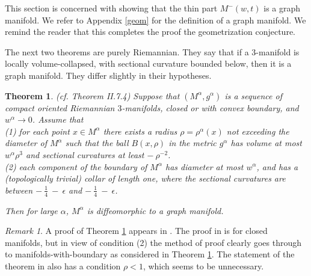 \documentclass[12pt]{amsart}
\newcommand{\al}{\alpha}
\numberwithin{equation}{section}
\theoremstyle{plain}
\newtheorem{theorem}[equation]{Theorem}
\theoremstyle{definition}
\theoremstyle{remark}
\newtheorem{remark}[equation]{Remark}
\begin{document}
This section is concerned with showing that the thin part
$M^-(w,t)$ is a graph manifold.  We refer to Appendix \ref{geom}
for the definition of a graph manifold.
We remind the reader that this completes the proof the geometrization 
conjecture.

The next two theorems are purely Riemannian. They say that if a $3$-manifold
is locally volume-collapsed, with sectional curvature bounded below, then it
is a graph manifold. They differ slightly in their hypotheses.

\begin{theorem} (cf. Theorem II.7.4) \label{thmII.7.4}
Suppose that $(M^\al, g^\al)$ is a sequence of compact oriented Riemannian
$3$-manifolds, closed or with convex boundary, and $w^\al \rightarrow 0$.
Assume that \\
(1) for each point $x \in M^\al$ there exists a radius $\rho = \rho^\al(x)$
not exceeding the diameter of $M^\al$
such that
the ball $B(x, \rho)$ in the metric $g^\al$ has volume at most
$w^\al \rho^3$ and sectional curvatures at least $- \: \rho^{-2}$.\\
(2) each component of the boundary of $M^\al$ has diameter at most
$w^\al$, and has a (topologically trivial) collar of length one, where
the sectional curvatures are between $- \: \frac14 \: - \: \epsilon$ and
$- \: \frac14 \: - \: \epsilon$. 

Then for large $\alpha$, $M^\al$ is diffeomorphic to a graph manifold.
\end{theorem}

\begin{remark}
A proof of Theorem \ref{thmII.7.4} appears in \cite[Section 8]{Shioya-Yamaguchi}.
The proof in \cite{Shioya-Yamaguchi} is for closed manifolds, but in
view of condition (2) the method of proof clearly goes through to 
manifolds-with-boundary as considered in Theorem \ref{thmII.7.4}.
The statement of the theorem in \cite[Theorem II.7.4]{Perelman2} also has a condition
$\rho < 1$, which seems to be unnecessary. 
\end{remark}
\end{document}
